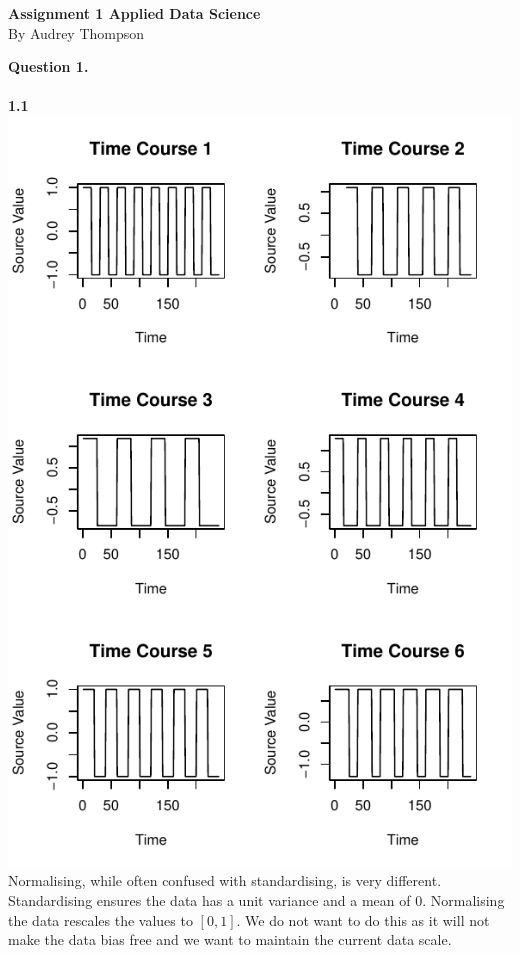 \documentclass[11pt]{article}
\begin{document}
\begin{lstlisting}
\end{lstlisting}
\begin{center}
\textbf{Assignment 1 Applied Data Science}
\\
By Audrey Thompson
\end{center}
\textbf{Question 1.}\\\\
\textbf{1.1}\\
\includegraphics[scale=.59]{plots/1_1plots_3x2.pdf}\\
Normalising, while often confused with standardising, is very different. Standardising ensures the data has a unit variance and a mean of 0. Normalising the data rescales the values to $[0, 1]$. We do not want to do this as it will not make the data bias free and we want to maintain the current data scale.\\\\
\end{document}
